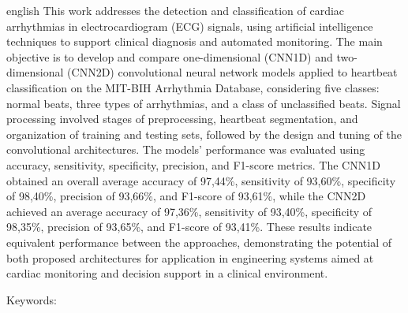 \begin{resumo}[Abstract]
  \vspace{-15pt}
  
  \begin{otherlanguage*}{english}
  This work addresses the detection and classification of cardiac arrhythmias in electrocardiogram (ECG) signals, using artificial intelligence 
  techniques to support clinical diagnosis and automated monitoring. The main objective is to develop and compare one-dimensional (CNN1D) and 
  two-dimensional (CNN2D) convolutional neural network models applied to heartbeat classification on the MIT-BIH Arrhythmia Database, considering 
  five classes: normal beats, three types of arrhythmias, and a class of unclassified beats. Signal processing involved stages of preprocessing, 
  heartbeat segmentation, and organization of training and testing sets, followed by the design and tuning of the convolutional architectures. 
  The models' performance was evaluated using accuracy, sensitivity, specificity, precision, and F1-score metrics. The CNN1D obtained an overall 
  average accuracy of 97,44\%, sensitivity of 93,60\%, specificity of 98,40\%, precision of 93,66\%, and F1-score of 93,61\%, while the CNN2D 
  achieved an average accuracy of 97,36\%, sensitivity of 93,40\%, specificity of 98,35\%, precision of 93,65\%, and F1-score of 93,41\%. 
  These results indicate equivalent performance between the approaches, demonstrating the potential of both proposed architectures for 
  application in engineering systems aimed at cardiac monitoring and decision support in a clinical environment.
  
  Keywords: \inlinekeywords
\end{otherlanguage*}
\end{resumo}